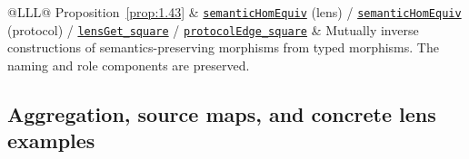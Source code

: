 \begin{xltabular}{\linewidth}{@{}LLL@{}}
\addlinespace[3pt]
Proposition~\ref{prop:1.43} & \href{https://github.com/iroha1203/AlgebraicArchitectureTheoryV2/blob/719f81f47d410701fd82c2bc88613cc140c59377/research/lean/ResearchLean/AG/RealizationReconstruction/CSAATForwardMorphisms.lean\#L81}{\texttt{semantic\allowbreak{}Hom\allowbreak{}Equiv}} (lens) / \href{https://github.com/iroha1203/AlgebraicArchitectureTheoryV2/blob/719f81f47d410701fd82c2bc88613cc140c59377/research/lean/ResearchLean/AG/RealizationReconstruction/CSAATForwardMorphisms.lean\#L258}{\texttt{semantic\allowbreak{}Hom\allowbreak{}Equiv}} (protocol) / \href{https://github.com/iroha1203/AlgebraicArchitectureTheoryV2/blob/719f81f47d410701fd82c2bc88613cc140c59377/research/lean/ResearchLean/AG/RealizationReconstruction/CSAATTypedOperationTranslation.lean\#L88}{\texttt{lens\allowbreak{}Get\_\allowbreak{}square}} / \href{https://github.com/iroha1203/AlgebraicArchitectureTheoryV2/blob/719f81f47d410701fd82c2bc88613cc140c59377/research/lean/ResearchLean/AG/RealizationReconstruction/CSAATTypedOperationTranslation.lean\#L216}{\texttt{protocol\allowbreak{}Edge\_\allowbreak{}square}} & Mutually inverse constructions of semantics-preserving morphisms from typed morphisms. The naming and role components are preserved. \\
\bottomrule
\end{xltabular}

\subsection*{Aggregation, source maps, and concrete lens examples}


